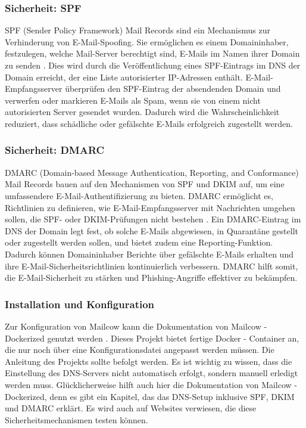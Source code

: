 \subsubsection{Sicherheit: SPF}
SPF (Sender Policy Framework) Mail Records sind ein Mechanismus zur Verhinderung von E-Mail-Spoofing. Sie ermöglichen es einem Domaininhaber, festzulegen, welche Mail-Server berechtigt sind, E-Mails im Namen ihrer Domain zu senden \cite{spf_erklärung}. Dies wird durch die Veröffentlichung eines SPF-Eintrags im DNS der Domain erreicht, der eine Liste autorisierter IP-Adressen enthält. E-Mail-Empfangsserver überprüfen den SPF-Eintrag der absendenden Domain und verwerfen oder markieren E-Mails als Spam, wenn sie von einem nicht autorisierten Server gesendet wurden. Dadurch wird die Wahrscheinlichkeit reduziert, dass schädliche oder gefälschte E-Mails erfolgreich zugestellt werden.

\subsubsection{Sicherheit: DMARC}
DMARC (Domain-based Message Authentication, Reporting, and Conformance) Mail Records bauen auf den Mechanismen von SPF und DKIM auf, um eine umfassendere E-Mail-Authentifizierung zu bieten. DMARC ermöglicht es, Richtlinien zu definieren, wie E-Mail-Empfangsserver mit Nachrichten umgehen sollen, die SPF- oder DKIM-Prüfungen nicht bestehen \cite{dmarc_erklärung}. Ein DMARC-Eintrag im DNS der Domain legt fest, ob solche E-Mails abgewiesen, in Quarantäne gestellt oder zugestellt werden sollen, und bietet zudem eine Reporting-Funktion. Dadurch können Domaininhaber Berichte über gefälschte E-Mails erhalten und ihre E-Mail-Sicherheitsrichtlinien kontinuierlich verbessern. DMARC hilft somit, die E-Mail-Sicherheit zu stärken und Phishing-Angriffe effektiver zu bekämpfen.

\subsubsection{Installation und Konfiguration}
Zur Konfiguration von Mailcow kann die Dokumentation von Mailcow - Dockerized genutzt werden \cite{mailcowDockerizedDNS}. Dieses Projekt bietet fertige Docker - Container an, die nur noch über eine Konfigurationsdatei angepasst werden müssen. Die Anleitung des Projekts sollte befolgt werden. Es ist wichtig zu wissen, dass die Einstellung des DNS-Servers nicht automatisch erfolgt, sondern manuell erledigt werden muss. Glücklicherweise hilft auch hier die Dokumentation von Mailcow - Dockerized, denn es gibt ein Kapitel, das das DNS-Setup inklusive SPF, DKIM und DMARC erklärt. Es wird auch auf Websites verwiesen, die diese Sicherheitsmechanismen testen können.

